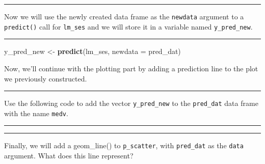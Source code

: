 \documentclass[
  12pt,
]{article}
\newenvironment{Shaded}{\begin{snugshade}}{\end{snugshade}}
\newcommand{\AttributeTok}[1]{\textcolor[rgb]{0.13,0.29,0.53}{#1}}
\newcommand{\CommentTok}[1]{\textcolor[rgb]{0.56,0.35,0.01}{\textit{#1}}}
\newcommand{\FunctionTok}[1]{\textcolor[rgb]{0.13,0.29,0.53}{\textbf{#1}}}
\newcommand{\NormalTok}[1]{#1}
\newcommand{\OtherTok}[1]{\textcolor[rgb]{0.56,0.35,0.01}{#1}}
\newcommand{\SpecialCharTok}[1]{\textcolor[rgb]{0.81,0.36,0.00}{\textbf{#1}}}
\begin{document}
\begin{center}\rule{0.5\linewidth}{0.5pt}\end{center}

Now we will use the newly created data frame as the \texttt{newdata}
argument to a \texttt{predict()} call for \texttt{lm\_ses} and we will
store it in a variable named \texttt{y\_pred\_new}.

\begin{center}\rule{0.5\linewidth}{0.5pt}\end{center}

\begin{Shaded}
\begin{Highlighting}[]
\NormalTok{y\_pred\_new }\OtherTok{\textless{}{-}} \FunctionTok{predict}\NormalTok{(lm\_ses, }\AttributeTok{newdata =}\NormalTok{ pred\_dat)}
\end{Highlighting}
\end{Shaded}

Now, we'll continue with the plotting part by adding a prediction line
to the plot we previously constructed.

\begin{center}\rule{0.5\linewidth}{0.5pt}\end{center}

Use the following code to add the vector \texttt{y\_pred\_new} to the
\texttt{pred\_dat} data frame with the name \texttt{medv}.

\begin{center}\rule{0.5\linewidth}{0.5pt}\end{center}

\begin{Shaded}
\end{Shaded}

\begin{center}\rule{0.5\linewidth}{0.5pt}\end{center}

Finally, we will add a geom\_line() to \texttt{p\_scatter}, with
\texttt{pred\_dat} as the \texttt{data} argument. What does this line
represent?
\end{document}
